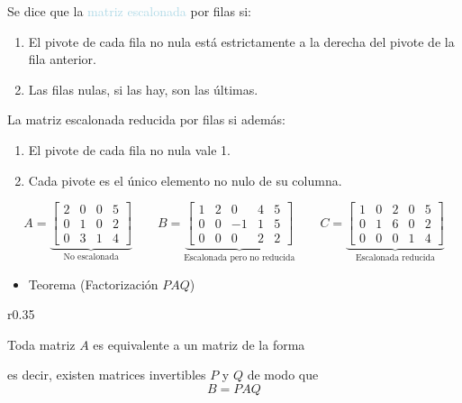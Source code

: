Se dice que la \textcolor{lightblue}{matriz escalonada} por filas si:
\begin{enumerate}[label=\color{lightblue}\arabic*)]
	\item El pivote de cada fila no nula está estrictamente a la derecha del pivote de la fila anterior.
	\item Las filas nulas, si las hay, son las últimas.
\end{enumerate}
La matriz escalonada reducida por filas si además:
\begin{enumerate}[label=\color{lightblue}\arabic*')]
	\item El pivote de cada fila no nula vale 1.
	\item Cada pivote es el único elemento no nulo de su columna.
\end{enumerate}
\Ej
\[ A=\underbrace{\begin{bmatrix}
		2 & 0 & 0 & 5 \\ 
		0 & 1 & 0 & 2 \\ 
		0 & 3 & 1 & 4
\end{bmatrix} }_{\text{No escalonada}} \qquad B=\underbrace{\begin{bmatrix}
		1 & 2 & 0 & 4 & 5 \\ 
		0 & 0 & -1 & 1 & 5 \\ 
		0 & 0 & 0 & 2 & 2
\end{bmatrix} }_{\text{Escalonada pero no
		reducida}} \qquad C=\underbrace{\begin{bmatrix}
		1 & 0 & 2 & 0 & 5 \\ 
		0 & 1 & 6 & 0 & 2 \\ 
		0 & 0 & 0 & 1 & 4
\end{bmatrix}}_{\text{Escalonada reducida}} \]
\begin{itemize}[label=\color{red}\textbullet, leftmargin=*]
	\item \color{lightblue}Teorema (Factorización $PAQ$)
\end{itemize}

\begin{wrapfigure}[3]{r}{0.35\linewidth}
\end{wrapfigure}

Toda matriz $A$ es equivalente a un matriz de la forma 
\begin{center}
\end{center}
es decir, existen matrices invertibles $P$ y $Q$ de modo que \[ B=PAQ \]

